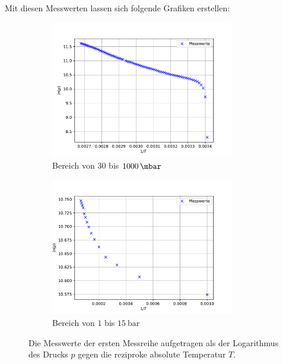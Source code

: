 Mit diesen Messwerten lassen sich folgende Grafiken erstellen:
\begin{figure}[H]
  \begin{subfigure}{0.48\textwidth}
      \includegraphics[height=6cm]{python/plota.pdf}
    \caption{Bereich von $30$ bis $\SI{1000}{\mbar}$}
    \label{fig:MesswerteKlein}
  \end{subfigure}
  \hfill
  \begin{subfigure}{0.48\textwidth}
    \includegraphics[height=6cm]{python/plotb.pdf}
    \caption{Bereich von $1$ bis $\SI{15}{\bar}$}
    \label{fig:MesswerteGross}
  \end{subfigure}
  \caption{Die Messwerte der ersten Messreihe aufgetragen als der Logarithmus des Drucks $p$
  gegen die reziproke absolute Temperatur $T$.}
  \label{fig:Teila}
\end{figure}

